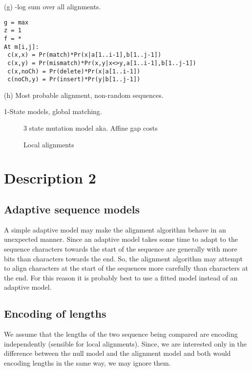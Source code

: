 \documentclass[letterpaper,11pt,oneside]{article}
\begin{document}
(g) -log sum over all alignments.


\begin{verbatim}
g = max
z = 1
f = *
At m[i,j]:
 c(x,x) = Pr(match)*Pr(x|a[1..i-1],b[1..j-1])
 c(x,y) = Pr(mismatch)*Pr(x,y|x<>y,a[1..i-1],b[1..j-1])
 c(x,noCh) = Pr(delete)*Pr(x|a[1..i-1])
 c(noCh,y) = Pr(insert)*Pr(y|b[1..j-1])
\end{verbatim}

(h) Most probable alignment, non-random sequences.


1-State models, global matching.

\begin{figure}
\centering
{}
\caption{\label{fig:3state}3 state mutation model aka. Affine gap costs}
\end{figure}

\begin{figure}
\centering
{}
\caption{\label{fig:local}Local alignments}
\end{figure}


\section{Description 2}


\subsection{Adaptive sequence models}

A simple adaptive model may make the alignment algorithm behave in an
unexpected manner.  Since an adaptive model takes some time to adapt to the
sequence characters towards the start of the sequence are generally with more
bits than characters towards the end.  So, the alignment algorithm may attempt
to align characters at the start of the sequences more carefully than
characters at the end.  For this reason it is probably best to use a fitted
model instead of an adaptive model.

\subsection{Encoding of lengths}

We assume that the lengths of the two sequence being compared are encoding
independently (sensible for local alignments).  Since, we are interested only in
the difference between the null model and the alignment model and both would
encoding lengths in the same way, we may ignore them.
\end{document}
